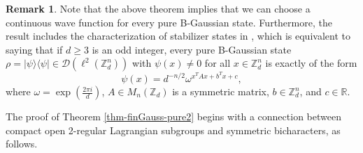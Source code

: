 \documentclass[12pt,reqno]{amsart}
\theoremstyle{definition}
\theoremstyle{definition}
\theoremstyle{definition}
\newtheorem{rem}[thm]{Remark}
\numberwithin{thm}{section}
\numberwithin{equation}{section}
\newcommand{\Real}{\mathbb R}
\newcommand{\la}{\langle}
\newcommand{\ra}{\rangle}
\newcommand{\D}{\mathcal{D}}
\newcommand{\z}{\mathbb{Z}}
\newcommand{\om}{\omega}
\begin{document}
\begin{rem}


Note that the above theorem implies that we can choose a continuous wave function for every pure B-Gaussian state. Furthermore, the result includes the characterization of stabilizer states in \cite[Lemma 18]{Gro}, which is equivalent to saying that if $d\geq 3$ is an odd integer, every pure B-Gaussian state $\rho=|\psi\ra\la\psi|\in \D(\ell^2(\z_d^n))$ with $\psi(x)\neq 0$ for all $x\in \z_d^n$ is exactly of the form
    $$\psi(x)=d^{-n/2}\om^{x^TAx+b^T x+c},$$
where $\om=\exp(\frac{2\pi i}{d})$, $A\in M_n(\z_d)$ is a symmetric matrix, $b\in \z_d^n$, and $c\in \Real$.

\end{rem}

The proof of Theorem \ref{thm-finGauss-pure2} begins with a connection between compact open 2-regular Lagrangian subgroups and symmetric bicharacters, as follows.
\end{document}
